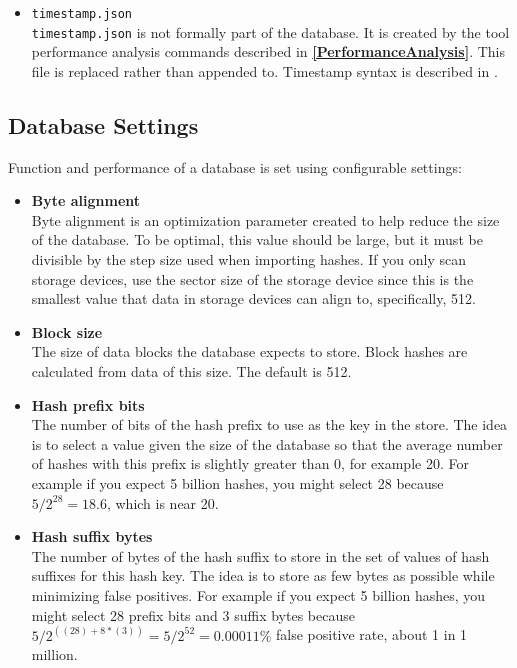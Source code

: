 \documentclass[11pt,fleqn]{article} %
\begin{document}
\begin{itemize}
\item \texttt{timestamp.json}\\
\verb+timestamp.json+ is not formally part of the \hdb database.  It is created by the \hdb tool performance analysis commands described in \textbf{\autoref{PerformanceAnalysis}}. This file is replaced rather than appended to. Timestamp syntax is described in \textbf{}.
\end{itemize}

\subsection{Database Settings}
\label{DBSettings}
Function and performance of a \hdb database is set using configurable settings:

\begin{itemize}
\item \textbf{Byte alignment}\\
Byte alignment is an optimization parameter created to help reduce the size of the database. To be optimal, this value should be large, but it must be divisible by the step size used when importing hashes. If you only scan storage devices, use the sector size of the storage device since this is the smallest value that data in storage devices can align to, specifically, 512.

\item \textbf{Block size}\\
The size of data blocks the database expects to store. Block hashes are calculated from data of this size. The default is 512.

\item \textbf{Hash prefix bits}\\
The number of bits of the hash prefix to use as the key in the store. The idea is to select a value given the size of the database so that the average number of hashes with this prefix is slightly greater than 0, for example 20. For example if you expect 5 billion hashes, you might select 28 because $5/2^{28}=18.6$, which is near 20.

\item \textbf{Hash suffix bytes}\\
The number of bytes of the hash suffix to store in the set of values of hash suffixes for this hash key. The idea is to store as few bytes as possible while minimizing false positives. For example if you expect 5 billion hashes, you might select 28 prefix bits and 3 suffix bytes because $5 / 2^{((28) + 8*(3))} = 5 / 2^{52} = 0.00011\%$ false positive rate, about 1 in 1 million.
\end{itemize}
\end{document}

